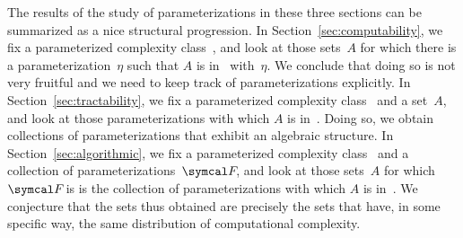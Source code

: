The results of the study of parameterizations in these three sections can be summarized as a nice structural progression.
In Section~\ref{sec:computability}, we fix a parameterized complexity class~, and look at those sets~$A$ for which there is a parameterization~$\eta$ such that $A$ is in~ with~$\eta$.
We conclude that doing so is not very fruitful and we need to keep track of parameterizations explicitly.
In Section~\ref{sec:tractability}, we fix a parameterized complexity class~ and a set~$A$, and look at those parameterizations with which $A$ is in~.
Doing so, we obtain collections of parameterizations that exhibit an algebraic structure.
In Section~\ref{sec:algorithmic}, we fix a parameterized complexity class~ and a collection of parameterizations~$\calF$, and look at those sets~$A$ for which $\calF$ is is the collection of parameterizations with which $A$ is in~.
We conjecture that the sets thus obtained are precisely the sets that have, in some specific way, the same distribution of computational complexity.
















